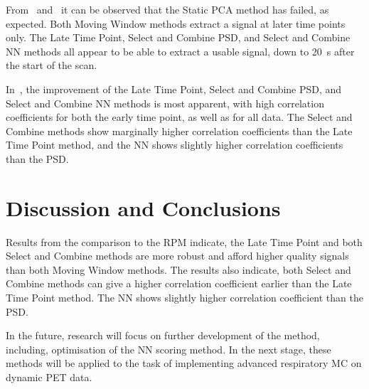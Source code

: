     
    
    
    From~ and~ it can be observed that the Static \acrshort{PCA} method has failed, as expected. Both Moving Window methods extract a signal at later time points only. The Late Time Point, Select and Combine \gls{PSD}, and Select and Combine \gls{NN} methods all appear to be able to extract a usable signal, down to \SI{20}{\second} after the start of the scan.
    
    In~, the improvement of the Late Time Point, Select and Combine \gls{PSD}, and Select and Combine \gls{NN} methods is most apparent, with high correlation coefficients for both the early time point, as well as for all data. The Select and Combine methods show marginally higher correlation coefficients than the Late Time Point method, and the \gls{NN} shows slightly higher correlation coefficients than the \gls{PSD}.
    

\vspace{-0.5cm}

\section{Discussion and Conclusions} \label{sec:discussion_and_conclusions}
    Results from the comparison to the \gls{RPM} indicate, the Late Time Point and both Select and Combine methods are more robust and afford higher quality signals than both Moving Window methods. The results also indicate, both Select and Combine methods can give a higher correlation coefficient earlier than the Late Time Point method. The \gls{NN} shows slightly higher correlation coefficient than the \gls{PSD}.
    
    In the future, research will focus on further development of the method, including, optimisation of the \gls{NN} scoring method. In the next stage, these methods will be applied to the task of implementing advanced respiratory \acrlong{MC} on dynamic \acrshort{PET} data.
